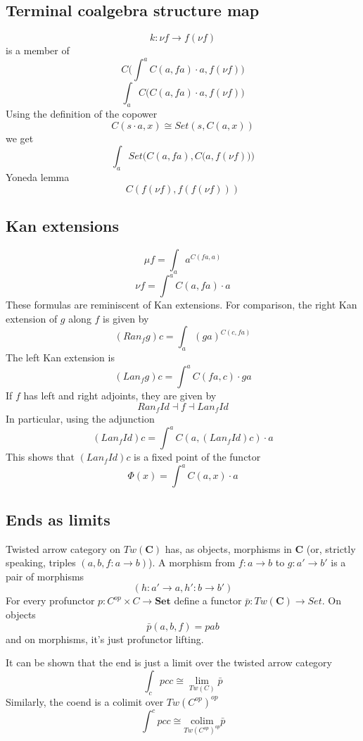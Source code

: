 \documentclass[11pt]{amsart}
\newcommand{\Cat}[1]{\mathbf{#1}}
\begin{document}
\subsection{Terminal coalgebra structure map}
\[k \colon \nu f \to f (\nu f)\]
is a member of
\[ C\Big( \int^a C(a, f a) \cdot a, f  (\nu f) \Big)\]
\[ \int_a C\Big( C(a, f a) \cdot a, f  (\nu f) \Big)\]
Using the definition of the copower
\[ C(s \cdot a, x) \cong Set(s, C(a, x))\]
we get
\[ \int_a Set\Big( C(a, f a), C\big( a, f  (\nu f) \big) \Big)\]
Yoneda lemma
\[ C(f(\nu f), f ( f (\nu f))) \]

\subsection{Kan extensions}
\[\mu f = \int_a a^{C(f a, a)}\]
\[\nu f = \int^a C(a, f a) \cdot a \]
These formulas are reminiscent of Kan extensions. 
For comparison, the right  Kan extension of $g$ along $f$ is given by
\[(Ran_f g) c = \int_a (g a)^{C(c, f a)}\]
The left Kan extension is
\[(Lan_f g) c = \int^a C(f a, c) \cdot g a \]
If $f$ has left and right adjoints, they are given by
\[Ran_f Id \dashv f \dashv Lan_f Id\]
In particular, using the adjunction
\[(Lan_f Id) c = \int^a C(a, (Lan_f Id) c) \cdot a\]
This shows that $(Lan_f Id) c$ is a fixed point of the functor
\[ \Phi(x) = \int^a C(a, x) \cdot a \]

\subsection{Ends as limits}

Twisted arrow category on $\textit{Tw}(\Cat C)$ has, as objects, morphisms in $\Cat C$ (or, strictly speaking, triples $(a, b, f \colon a \to b)$). A morphism from $f \colon a \to b$ to $g \colon a' \to b'$ is a pair of morphisms 
\[(h \colon a' \to a, h' \colon b \to b')\]
For every profunctor $p \colon C^{op} \times C \to \Cat{Set}$ define a functor $\bar p \colon \textit{Tw}(\Cat C) \to Set$. On objects
\[\bar p (a, b, f) = p a b\]
and on morphisms, it's just profunctor lifting.

It can be shown that the end is just a limit over the twisted arrow category
\[\int_c p c c \cong \lim_{Tw(C)} \bar p\]
Similarly, the coend is a colimit over $Tw(C^{op} )^{op}$
\[\int^c p c c \cong \underset {Tw(C^{op})^{op}}  { \mbox{colim}} \bar p\]
\end{document}
